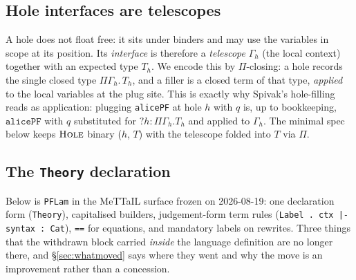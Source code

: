\documentclass[11pt]{article}
\newcommand{\rul}[1]{\ensuremath{\textsc{#1}}}
\newcommand{\hole}[2]{\ensuremath{?#1\!:\!#2}}
\newcommand{\tele}{\Gamma}
\newcommand{\code}[1]{\lstinline[language=rho,basicstyle=\ttfamily\small]|#1|}
\begin{document}
\subsection{Hole interfaces are telescopes}\label{sec:teleholes}
A hole does not float free: it sits under binders and may use the variables in scope at its position.
Its \emph{interface} is therefore a \emph{telescope} $\tele_h$ (the local context) together with an
expected type $T_h$. We encode this by $\Pi$-closing: a hole records the single closed type
$\Pi\tele_h.\,T_h$, and a filler is a closed term of that type, \emph{applied} to the local variables
at the plug site. This is exactly why Spivak's hole-filling reads as application: plugging
\code{alicePF} at hole $h$ with $q$ is, up to bookkeeping, $\mathtt{alicePF}$ with $q$ substituted for
$\hole{h}{\Pi\tele_h.T_h}$ and applied to $\tele_h$. The minimal spec below keeps \rul{Hole} binary
($h$, $T$) with the telescope folded into $T$ via $\Pi$.

\subsection{The \texttt{Theory} declaration}\label{sec:theorydecl}
Below is \texttt{PFLam} in the MeTTaIL surface frozen on 2026-08-19: one declaration form
(\texttt{Theory}), capitalised builders, judgement-form term rules
(\lstinline[language=mettail,basicstyle=\ttfamily\small]!Label . ctx |- syntax : Cat!), \texttt{==}
for equations, and mandatory labels on rewrites. Three things that the withdrawn block carried
\emph{inside} the language definition are no longer there, and \S\ref{sec:whatmoved} says where they
went and why the move is an improvement rather than a concession.
\end{document}
